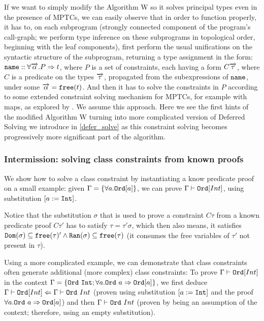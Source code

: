 If we want to simply modify the Algorithm W so it solves principal types even in the presence of MPTCs, we can easily observe that in order to function properly, it has to, on each subprogram (strongly connected component of the program's call-graph; we perform type inference on these subprograms in topological order, beginning with the leaf components), first perform the usual unifications on the syntactic structure of the subprogram, returning a type assignment in the form: $\mathtt{name} :: \forall \overrightarrow{\alpha} . P  \Rightarrow t$, where $P$ is a set of constraints, each having a form $C \overrightarrow{\tau}$, where $C$ is a predicate on the types $\overrightarrow{\tau}$, propagated from the subexpressions of $\mathtt{name}$, under some $\overrightarrow{\alpha} = \mathtt{free} (t)$. And then it has to solve the constraints in $P$ according to some extended constraint solving mechanism for MPTCs, for example with maps, as explored by \cite{jones2000type}. We assume this approach. Here we see the first hints of the modified Algorithm W turning into more complicated version of Deferred Solving we introduce in \cref{defer_solve} as this constraint solving becomes progressively more significant part of the algorithm.

\subsubsection{Intermission: solving class constraints from known proofs}

We show how to solve a class constraint by instantiating a know predicate proof on a small example: given $\Gamma = \{\forall a . \mathtt{Ord} [a]\}$, we can prove $\Gamma \vdash \mathtt{Ord} [Int]$, using substitution $[a := \mathtt{Int}]$. \cite{jones1999typing}

Notice that the substitution $\sigma$ that is used to prove a constraint $C \tau$ from a known predicate proof $C \tau'$ has to satisfy $\tau = \tau' \sigma$, which then also means, it satisfies $\mathtt{Dom} (\sigma) \subseteq \mathtt{free} (\tau)' \land \mathtt{Ran} (\sigma) \subseteq \mathtt{free} (\tau)$ (it consumes the free variables of $\tau'$ not present in $\tau$).

Using a more complicated example, we can demonstrate that class constraints often generate additional (more complex) class constraints: To prove $\Gamma \vdash \mathtt{Ord} [Int]$ in the context $\Gamma = \{\mathtt{Ord}\ \mathtt{Int}; \forall a . \mathtt{Ord}\ a \Rightarrow \mathtt{Ord} [a]\}$, we first deduce $\Gamma \vdash \mathtt{Ord} [Int] \Leftarrow \Gamma \vdash \mathtt{Ord}\ Int$ (proven using substitution $[a := \mathtt{Int}]$ and the proof $\forall a . \mathtt{Ord}\ a \Rightarrow \mathtt{Ord} [a]$) and then $\Gamma \vdash \mathtt{Ord}\ Int$ (proven by being an assumption of the context; therefore, using an empty substitution).

